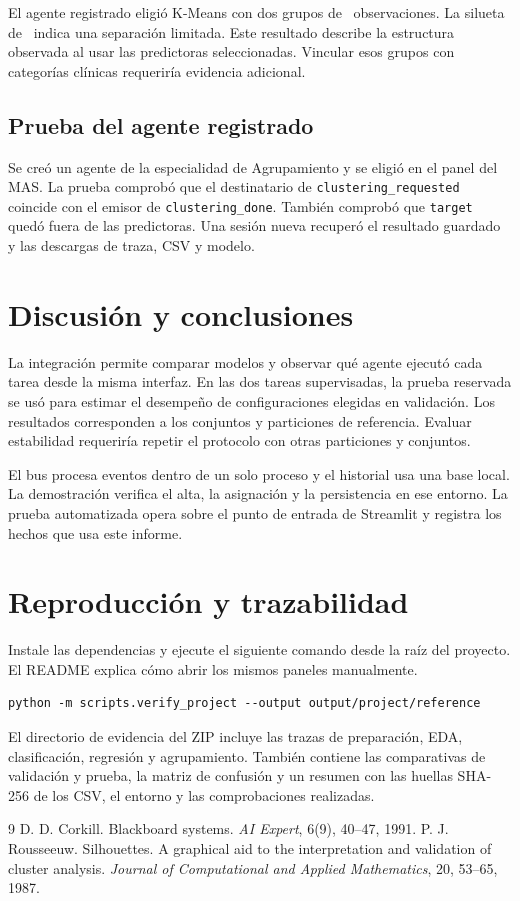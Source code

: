 \documentclass[11pt,a4paper]{article}
\begin{document}
El agente registrado eligió K-Means con dos grupos de \ClusterSizes\ observaciones. La silueta de \ClusterScore\ indica una separación limitada. Este resultado describe la estructura observada al usar las predictoras seleccionadas. Vincular esos grupos con categorías clínicas requeriría evidencia adicional.

\subsection{Prueba del agente registrado}

Se creó un agente de la especialidad de Agrupamiento y se eligió en el panel del MAS. La prueba comprobó que el destinatario de \texttt{clustering\_requested} coincide con el emisor de \texttt{clustering\_done}. También comprobó que \texttt{target} quedó fuera de las predictoras. Una sesión nueva recuperó el resultado guardado y las descargas de traza, CSV y modelo.

\section{Discusión y conclusiones}

La integración permite comparar modelos y observar qué agente ejecutó cada tarea desde la misma interfaz. En las dos tareas supervisadas, la prueba reservada se usó para estimar el desempeño de configuraciones elegidas en validación. Los resultados corresponden a los conjuntos y particiones de referencia. Evaluar estabilidad requeriría repetir el protocolo con otras particiones y conjuntos.

El bus procesa eventos dentro de un solo proceso y el historial usa una base local. La demostración verifica el alta, la asignación y la persistencia en ese entorno. La prueba automatizada opera sobre el punto de entrada de Streamlit y registra los hechos que usa este informe.
\clearpage

\section{Reproducción y trazabilidad}

Instale las dependencias y ejecute el siguiente comando desde la raíz del proyecto. El README explica cómo abrir los mismos paneles manualmente.
\begin{verbatim}
python -m scripts.verify_project --output output/project/reference
\end{verbatim}
El directorio de evidencia del ZIP incluye las trazas de preparación, EDA, clasificación, regresión y agrupamiento. También contiene las comparativas de validación y prueba, la matriz de confusión y un resumen con las huellas SHA-256 de los CSV, el entorno y las comprobaciones realizadas.

\begin{thebibliography}{9}
 D. D. Corkill. Blackboard systems. \emph{AI Expert}, 6(9), 40--47, 1991.
 P. J. Rousseeuw. Silhouettes. A graphical aid to the interpretation and validation of cluster analysis. \emph{Journal of Computational and Applied Mathematics}, 20, 53--65, 1987.
\end{thebibliography}
\end{document}
